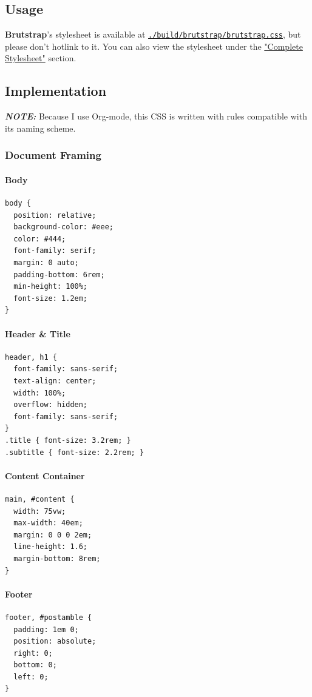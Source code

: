\documentclass[11pt]{article}
\begin{document}
\subsection*{Usage}
\label{sec:orge5dfdf6}
\textbf{Brutstrap}'s stylesheet is available at
\href{./build/brutstrap/brutstrap.css}{\texttt{./build/brutstrap/brutstrap.css}}, but please don't hotlink to it. You
can also view the stylesheet under the \hyperref[sec:org384bbdf]{"Complete Stylesheet"} section.
\subsection*{Implementation}
\label{sec:org9fba82d}
\textbf{\emph{NOTE:}} Because I use Org-mode, this CSS is written with rules
compatible with its naming scheme.
\subsubsection*{Document Framing}
\label{sec:org943112a}
\paragraph*{Body}
\label{sec:orga94979c}
\begin{verbatim}
body {
  position: relative;
  background-color: #eee;
  color: #444;
  font-family: serif;
  margin: 0 auto;
  padding-bottom: 6rem;
  min-height: 100%;
  font-size: 1.2em;
}
\end{verbatim}
\paragraph*{Header \& Title}
\label{sec:orgcd6e392}
\begin{verbatim}
header, h1 {
  font-family: sans-serif;
  text-align: center;
  width: 100%;
  overflow: hidden;
  font-family: sans-serif;
}
.title { font-size: 3.2rem; }
.subtitle { font-size: 2.2rem; }
\end{verbatim}
\paragraph*{Content Container}
\label{sec:org6ec5d6a}
\begin{verbatim}
main, #content {
  width: 75vw;
  max-width: 40em;
  margin: 0 0 0 2em;
  line-height: 1.6;
  margin-bottom: 8rem;
}
\end{verbatim}
\paragraph*{Footer}
\label{sec:org05c091c}
\begin{verbatim}
footer, #postamble {
  padding: 1em 0;
  position: absolute;
  right: 0;
  bottom: 0;
  left: 0;
}
\end{verbatim}
\end{document}
